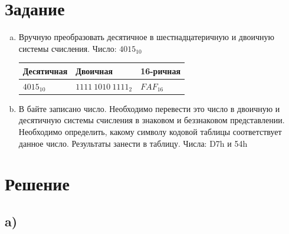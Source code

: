 \documentclass[12pt]{article}
\begin{document}
	
	\section*{Задание}
	
	
	\begin{enumerate}[a)]
		\item Вручную преобразовать десятичное в шестнадцатеричную и двоичную системы счисления. Число: $4015_{10}$
		
		\begin{table}[h]
			\centering
			\begin{tabularx}{0.88\textwidth}{| X| X| X|}
				\hline	
				Десятичная & Двоичная & 16-ричная \\  \hline
				$4015_{10}$ & $1111\:1010\:1111_2$  & $FAF_{16}$ \\   \hline	
				
			\end{tabularx}
		\end{table}
		
		\item В байте записано число. Необходимо перевести это число в двоичную и десятичную системы счисления в знаковом и беззнаковом представлении. Необходимо определить, какому символу кодовой таблицы соответствует данное число. Результаты занести в таблицу. Числа: D7h и 54h
	\end{enumerate}
	
	\newpage
	
	
	\section*{Решение}
	\subsection*{a)}
	
\end{document}
